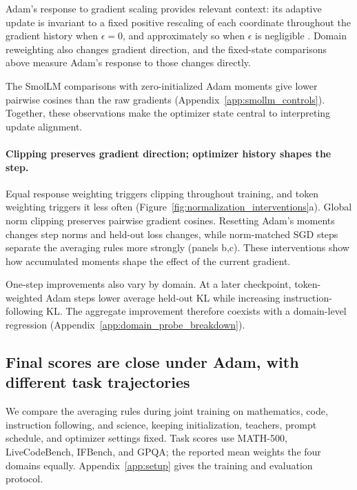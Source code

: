 

Adam's response to gradient scaling provides relevant context: its adaptive update is invariant to a fixed positive rescaling of each coordinate throughout the gradient history when $\epsilon=0$, and approximately so when $\epsilon$ is negligible \citep{kingma2015adam}. Domain reweighting also changes gradient direction, and the fixed-state comparisons above measure Adam's response to those changes directly.

The SmolLM comparisons with zero-initialized Adam moments give lower pairwise cosines than the raw gradients (Appendix~\ref{app:smollm_controls}). Together, these observations make the optimizer state central to interpreting update alignment.

\paragraph{Clipping preserves gradient direction; optimizer history shapes the step.}
Equal response weighting triggers clipping throughout training, and token weighting triggers it less often (Figure~\ref{fig:normalization_interventions}a). Global norm clipping preserves pairwise gradient cosines. Resetting Adam's moments changes step norms and held-out loss changes, while norm-matched SGD steps separate the averaging rules more strongly (panels b,c). These interventions show how accumulated moments shape the effect of the current gradient.

One-step improvements also vary by domain. At a later checkpoint, token-weighted Adam steps lower average held-out KL while increasing instruction-following KL. The aggregate improvement therefore coexists with a domain-level regression (Appendix~\ref{app:domain_probe_breakdown}).



\subsection{Final scores are close under Adam, with different task trajectories}

We compare the averaging rules during joint training on mathematics, code, instruction following, and science, keeping initialization, teachers, prompt schedule, and optimizer settings fixed. Task scores use MATH-500, LiveCodeBench, IFBench, and GPQA; the reported mean weights the four domains equally. Appendix~\ref{app:setup} gives the training and evaluation protocol.

